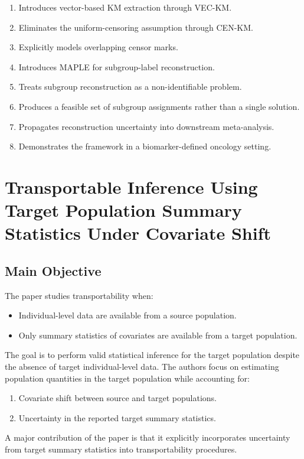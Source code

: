 \documentclass[11pt]{article}
\begin{document}
\begin{enumerate}
    \item Introduces vector-based KM extraction through VEC-KM.
    \item Eliminates the uniform-censoring assumption through CEN-KM.
    \item Explicitly models overlapping censor marks.
    \item Introduces MAPLE for subgroup-label reconstruction.
    \item Treats subgroup reconstruction as a non-identifiable problem.
    \item Produces a feasible set of subgroup assignments rather than a single solution.
    \item Propagates reconstruction uncertainty into downstream meta-analysis.
    \item Demonstrates the framework in a biomarker-defined oncology setting.
\end{enumerate}

\section{Transportable Inference Using Target Population Summary Statistics Under Covariate Shift}

\subsection*{Main Objective}

The paper studies transportability when:
\begin{itemize}
    \item Individual-level data are available from a source population.
    \item Only summary statistics of covariates are available from a target population.
\end{itemize}
The goal is to perform valid statistical inference for the target population despite the absence of target individual-level data. The authors focus on estimating population quantities in the target population while accounting for:
\begin{enumerate}
    \item Covariate shift between source and target populations.
    \item Uncertainty in the reported target summary statistics.
\end{enumerate}
A major contribution of the paper is that it explicitly incorporates uncertainty from target summary statistics into transportability procedures.
\end{document}
